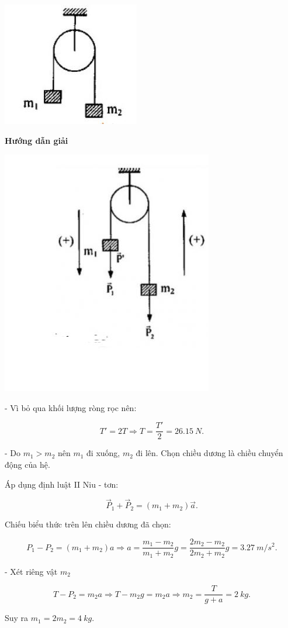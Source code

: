 \begin{dang}
{		\begin{center}
			\includegraphics[scale=0.5]{../figs/VN10-PH-12-A-003-1-V2-04.jpg}
		\end{center}
	}
	{	\begin{center}
			\textbf{Hướng dẫn giải}
		\end{center}
		\begin{center}
			\includegraphics[scale=0.6]{../figs/VN10-PH-12-A-003-1-V2-05.jpg}
		\end{center}
		- Vì bỏ qua khối lượng ròng rọc nên: 
		
		$$ T' = 2T \Rightarrow T = \dfrac{T'}{2} = \SI{26,15}{N}.$$
		
		- Do $m_1 > m_2$ nên $m_1$ đi xuống, $m_2$ đi lên. Chọn chiều dương là chiều chuyển động của hệ.
		
		
		Áp dụng định luật II Niu - tơn:
		
		$$\vec P_1 + \vec P_2 =(m_1 + m_2) \vec a.$$
		
		Chiếu biểu thức trên lên chiều dương đã chọn:
		
		$$P_1 - P_2 =(m_1+m_2)a \Rightarrow a = \dfrac{m_1 - m_2}{m_1 +m_2} g= \dfrac{2m_2 -m_2}{2m_2 + m_2}g	= \SI{3,27}{m/s^2}.$$	
		
		- Xét riêng vật $m_2$ 
		
		$$T - P_2 =m_2a \Rightarrow T -m_2g = m_2a \Rightarrow m_2 = \dfrac{T}{g+a} = \SI{2}{kg}.$$
		
		Suy ra $m_1 =2m_2 = \SI{4}{kg}.$
	}
	
\end{dang}